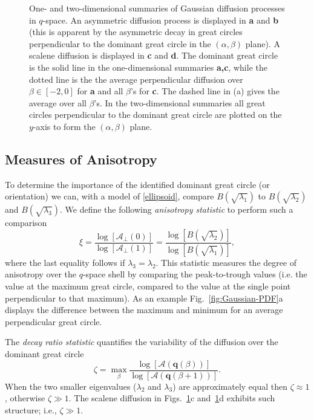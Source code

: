 \documentclass[dvips,aoas,preprint]{imsart}
\numberwithin{equation}{section}
\theoremstyle{plain}
\newcommand{\q}{\mathbf{q}}
\newcommand{\cA}{\mathcal{A}}
\begin{document}
\begin{figure}[!htbp]
\begin{minipage}[]{0.35\textwidth}
    \end{minipage}
  \caption{One- and two-dimensional summaries of Gaussian diffusion
    processes in $q$-space.  An asymmetric diffusion process is
    displayed in {\bf a} and {\bf b} (this is apparent by the
    asymmetric decay in great circles perpendicular to the dominant
    great circle in the $(\alpha,\beta)$ plane).  A scalene diffusion
    is displayed in {\bf c} and {\bf d}.  The dominant great circle is
    the solid line in the one-dimensional summaries {\bf a,c}, while
    the dotted line is the the average perpendicular diffusion over
    $\beta\in[-2,0]$ for {\bf a} and all $\beta$'s for {\bf c}.  The
    dashed line in (a) gives the average over all $\beta$'s.  In the
    two-dimensional summaries all great circles perpendicular to the
    dominant great circle are plotted on the $y$-axis to form the
    $(\alpha,\beta)$ plane.}
  \label{fig:Gaussian-PDF2}
\end{figure}

\subsection{Measures of Anisotropy}

To determine the importance of the identified dominant great circle
(or orientation) we can, with a model of \eqref{ellipsoid}, compare
$B(\sqrt{\lambda_1})$ to $B(\sqrt{\lambda_2})$ and
$B(\sqrt{\lambda_3})$.  We define the following {\em anisotropy
statistic} to perform such a comparison
\begin{equation}\label{e:anisotropy}
  \xi = \frac{\log [{\cA}_\perp(0)]}{\log [{\cA}_\perp(1)]} =
  \frac{\log [B\left(\sqrt{\lambda_2}\right)]}
       {\log [B\left(\sqrt{\lambda_1}\right)]},
\end{equation}
where the last equality follows if $\lambda_3=\lambda_2$.  This
statistic measures the degree of anisotropy over the $q$-space shell
by comparing the peak-to-trough values (i.e. the value at the maximum
great circle, compared to the value at the single point perpendicular
to that maximum).  As an example Fig.~\ref{fig:Gaussian-PDF}a displays
the difference between the maximum and minimum for an average
perpendicular great circle.

The {\em decay ratio statistic} quantifies the variability of the
diffusion over the dominant great circle
\begin{equation}\label{zieq}
  \zeta =
  \max_{\beta}\frac{\log[\cA(\q(\beta))]}{\log[\cA(\q(\beta+1))]}.
\end{equation} 
When the two smaller eigenvalues ($\lambda_2$ and $\lambda_3$) are
approximately equal then $\zeta\approx1$, otherwise $\zeta\gg1$. The
scalene diffusion in Figs.~\ref{fig:Gaussian-PDF2}c
and~\ref{fig:Gaussian-PDF2}d exhibits such structure;
i.e., $\zeta\gg1$.
\end{document}

